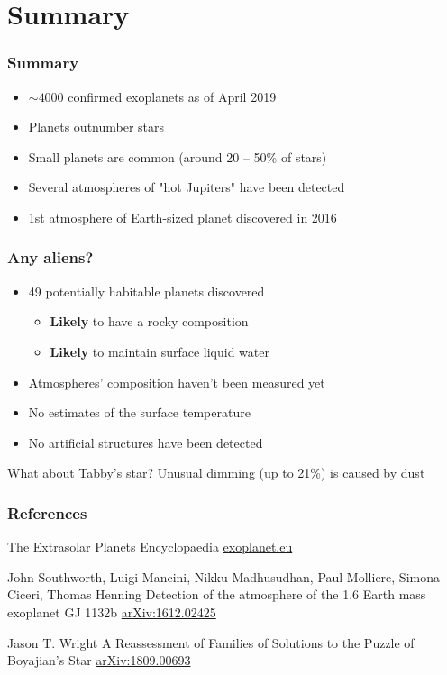 \documentclass[aspectratio=169]{beamer}
\begin{document}
\section{Summary}
\begin{frame}
\frametitle{Summary}
\begin{itemize}
\item $\sim 4000$ confirmed exoplanets as of April 2019
\item Planets outnumber stars
\item Small planets are common (around 20 -- 50\% of stars)
\item Several atmospheres of "hot Jupiters" have been detected
\item 1st atmosphere of Earth-sized planet discovered in 2016 \cite{arXiv:1612.02425}
\end{itemize}
\end{frame}

\begin{frame}
\frametitle{Any aliens?}
\begin{itemize}
\item 49 potentially habitable planets discovered
\begin{itemize}
\item {\bf Likely} to have a rocky composition
\item {\bf Likely} to maintain surface liquid water
\end{itemize}
\item Atmospheres' composition haven't been measured yet
\item No estimates of the surface temperature
\item No artificial structures have been detected
\end{itemize}
\begin{block}{What about \href{http://en.wikipedia.org/wiki/KIC_8462852}{Tabby's star}?}
Unusual dimming (up to 21\%) is caused by dust \cite{arXiv:1809.00693}
\end{block}
\end{frame}

\begin{frame}[allowframebreaks]
\frametitle{References}
\footnotesize{


\begin{thebibliography}{99}

The Extrasolar Planets Encyclopaedia
\newblock \href{http://exoplanet.eu}{exoplanet.eu}

John Southworth, Luigi Mancini, Nikku Madhusudhan, Paul Molliere, Simona Ciceri, Thomas Henning
\newblock Detection of the atmosphere of the 1.6 Earth mass exoplanet GJ 1132b
\newblock \href{http://arxiv.org/abs/1612.02425}{arXiv:1612.02425}

Jason T. Wright
\newblock A Reassessment of Families of Solutions to the Puzzle of Boyajian's Star
\newblock \href{https://arxiv.org/abs/1809.00693}{arXiv:1809.00693}
\end{thebibliography}
}
\end{frame}
\end{document}

